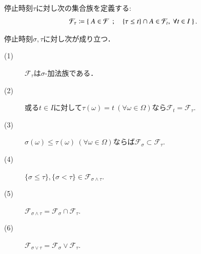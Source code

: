 	\begin{screen}
		\begin{dfn}[停止時刻で定まる事象]
			停止時刻$\tau$に対し次の集合族を定義する:
			\begin{align}
				\mathcal{F}_\tau \coloneqq \left\{\ A \in \mathcal{F}\ \, ; \quad \{ \tau \leq t \} \cap A \in \mathcal{F}_t,\ \forall t \in I\ \right\}.
			\end{align}
		\end{dfn}
	\end{screen}
	
	\begin{screen}
		\begin{prp}[停止時刻の性質]
			停止時刻$\sigma, \tau$に対し次が成り立つ．
			\begin{description}
				\item[(1)] $\mathcal{F}_\tau$は$\sigma$-加法族である．
				\item[(2)] 或る$t \in I$に対して$\tau(\omega) = t\ (\forall \omega \in \Omega)$なら$\mathcal{F}_t = \mathcal{F}_\tau$.
				\item[(3)] $\sigma(\omega) \leq \tau(\omega)\ (\forall \omega \in \Omega)$ならば$\mathcal{F}_\sigma \subset \mathcal{F}_\tau$.
				\item[(4)] $\{\sigma \leq \tau\},\{\sigma < \tau\} \in \mathcal{F}_{\sigma \wedge \tau}$.
				\item[(5)] $\mathcal{F}_{\sigma \wedge \tau} = \mathcal{F}_\sigma \cap \mathcal{F}_\tau$.
				\item[(6)] $\mathcal{F}_{\sigma \vee \tau} = \mathcal{F}_\sigma \vee \mathcal{F}_\tau$.
			\end{description}
			\label{prp:properties_of_stopping_times}
		\end{prp}
	\end{screen}
	
